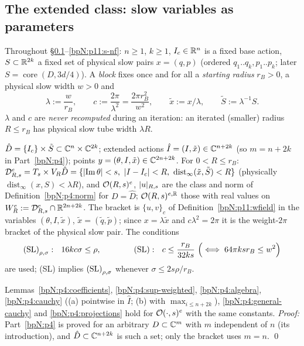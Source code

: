 \begingroup\sloppy
\subsection{The extended class: slow variables as parameters}\label{bpN:p11:s-ext-class}

Throughout \S\ref{bpN:p11:s-ext-class}--\ref{bpN:p11:s-nf}: $n\ge1$, $k\ge1$, $I_c\in\mathbb{R}^n$ is a fixed base action, $S\subset\mathbb{R}^{2k}$ a fixed set of physical slow pairs $x=(q,p)$ (ordered $q_1..q_k,p_1..p_k$; later $S=\operatorname{core}(D,3d/4)$). A \emph{block} fixes once and for all a \emph{starting radius} $r_B>0$, a physical slow width $w>0$ and
\[\lambda:=\frac w{r_B},\qquad c:=\frac{2\pi}{\lambda^2}=\frac{2\pi r_B^2}{w^2},\qquad \tilde x:=x/\lambda,\qquad\tilde S:=\lambda^{-1}S .\]
$\lambda$ and $c$ are \emph{never recomputed} during an iteration: an iterated (smaller) radius $R\le r_B$ has physical slow tube width $\lambda R$.

\begin{definition}\label{bpN:p11:ext-class}
$\hat D=\{I_c\}\times\tilde S\subset\mathbb{C}^n\times\mathbb{C}^{2k}$; extended actions $\hat I=(I,\tilde x)\in\mathbb{C}^{n+2k}$ (so $m=n+2k$ in Part~\ref{bpN:p4}); points $y=(\theta,I,\tilde x)\in\mathbb{C}^{2n+2k}$. For $0<R\le r_B$:
$\Dom Rs^{e}=T_s\times V_R\hat D=\{\abs{\operatorname{Im}\theta}<s,\ \abs{I-I_c}<R,\ \operatorname{dist}_\infty(\tilde x,\tilde S)<R\}$ (physically $\operatorname{dist}_\infty(x,S)<\lambda R$), and $\mathcal O(R,s)^e$, $\lvert u\rvert_{R,s}$ are the class and norm of Definition~\ref{bpN:p4:norm} for $D=\hat D$; $\mathcal O(R,s)^{e,\mathbb{R}}$ those with real values on $W^e_R:=\mathcal D_{R,s}^e\cap\mathbb{R}^{2n+2k}$. The bracket is $\{u,v\}_c$ of Definition~\ref{bpN:p11:wfield} in the variables $(\theta,I,\tilde x)$, $\tilde x=(\tilde q,\tilde p)$; since $x=\lambda\tilde x$ and $c\lambda^2=2\pi$ it is the weight-$2\pi$ bracket of the physical slow pair. The conditions
\[\textup{(SL)}_{\rho,\sigma}:\ \ 16kc\sigma\le\rho,\qquad\qquad\textup{(SL)}:\ \ c\le\frac{r_B}{32ks}\ \Bigl(\iff64\pi ksr_B\le w^2\Bigr)\]
are used; (SL) implies $\textup{(SL)}_{\rho,\sigma}$ whenever $\sigma\le2s\rho/r_B$.
\end{definition}

\begin{lemma}\label{bpN:p11:ext-part4}
Lemmas~\ref{bpN:p4:coefficients}, \ref{bpN:p4:sup-weighted}, \ref{bpN:p4:algebra}, \ref{bpN:p4:cauchy} ((a) pointwise in $\hat I$; (b) with $\max_{i\le n+2k}$), \ref{bpN:p4:general-cauchy} and \ref{bpN:p4:projections} hold for $\mathcal O(\cdot,s)^e$ with the same constants. \emph{Proof:} Part~\ref{bpN:p4} is proved for an arbitrary $D\subset\mathbb{C}^m$ with $m$ independent of $n$ (its introduction), and $\hat D\subset\mathbb{C}^{n+2k}$ is such a set; only the bracket uses $m=n$. \qed
\end{lemma}

